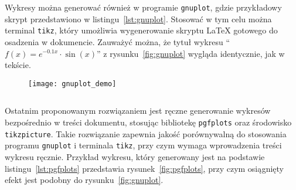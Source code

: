 Wykresy można generować również w programie \texttt{gnuplot}, gdzie przykładowy skrypt przedstawiono w listingu~\ref{lst:gnuplot}. Stosować w tym celu można terminal \texttt{tikz}, który umożliwia wygenerowanie skryptu \LaTeX{} gotowego do osadzenia w dokumencie. Zauważyć można, że tytuł wykresu \enquote{$f(x) = e^{-0.1x} \cdot \sin(x)$} z rysunku~\ref{fig:gnuplot} wygląda identycznie, jak w tekście.

\begin{figure}[htb!]
\texttt{[image: gnuplot\_demo]}
\end{figure}

\begin{listing}[hbt!]
\inputminted[linenos, breaklines]{gnuplot}{skrypty/plot_demo.gnuplot}
\end{listing}

Ostatnim proponowanym rozwiązaniem jest ręczne generowanie wykresów bezpośrednio w treści dokumentu, stosując bibliotekę \texttt{pgfplots} oraz środowisko \texttt{tikzpicture}. Takie rozwiązanie zapewnia jakość porównywalną do stosowania programu \texttt{gnuplot} i terminala \texttt{tikz}, przy czym wymaga wprowadzenia treści wykresu ręcznie. Przykład wykresu, który generowany jest na podstawie listingu~\ref{lst:pgfplots} przedstawia rysunek~\ref{fig:pgfplots}, przy czym osiągnięty efekt jest podobny do rysunku~\ref{fig:gnuplot}.

\begin{figure}[htb!]
\end{figure}

